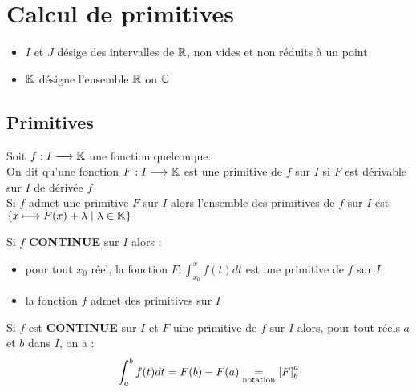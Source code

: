 \chapter{Calcul de primitives}

\minitoc
\begin{nota}
    \begin{itemize}
        \item \(I\) et \(J\) désige des intervalles de \(\mathbb{R}\), non vides et non réduits à un point
        \item \(\mathbb{K}\) désigne l'ensemble \(\mathbb{R}\) ou \(\mathbb{C}\)
    \end{itemize}
\end{nota}

\section{Primitives}

\begin{defprop}
    Soit \(f:I\longrightarrow\mathbb{K}\) une fonction quelconque. \\
    On dit qu'une fonction \(F:I\longrightarrow\mathbb{K}\) est une primitive de \(f\) sur \(I\) si \(F\) est dérivable sur \(I\) de dérivée \(f\) \\
    Si \(f\) admet une primitive \(F\) sur \(I\) alors l'ensemble des primitives de \(f\) sur \(I\) est \(\left\lbrace x\longmapsto F(x)+ \lambda \;\middle|\; \lambda \in \mathbb{K}\right\rbrace\)
\end{defprop}

\begin{theo}
    Si \(f\) \textbf{CONTINUE} sur \(I\) alors : 
    \begin{itemize}
        \item pour tout \(x_0\) réel, la fonction \(F:\int_{x_0}^{x} f(t) dt\) est une primitive de \(f\) sur \(I\)
        \item la fonction \(f\) admet des primitives sur \(I\)
    \end{itemize}
\end{theo}

\begin{defprop}
    Si \(f\) est \textbf{CONTINUE} sur \(I\) et \(F\) uine primitive de \(f\) sur \(I\) alors, pour tout réels \(a\) et \(b\) dans \(I\), on a :
    \[\int_{a}^b f(t) dt = F(b)-F(a) \underset{\mathrm{notation}}{=} \left[F\right]^a_b \]
\end{defprop}

